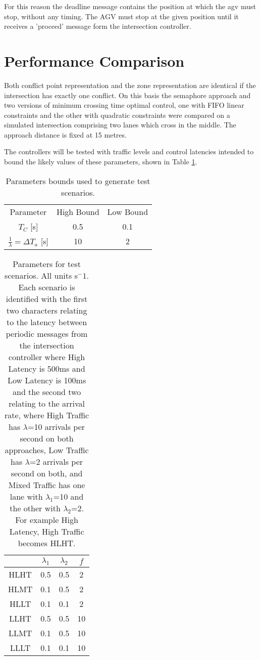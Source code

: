  For this reason the deadline message contains the position at which the agv must stop, without any timing. The AGV must stop at the given position until it receives a 'proceed' message form the intersection controller.
 
 \section{Performance Comparison}
 Both conflict point representation and the zone representation are identical if the intersection has exactly one conflict. On this basis the semaphore approach and two versions of minimum crossing time optimal control, one with FIFO linear constraints and the other with quadratic constraints were compared on a simulated intersection comprising two lanes which cross in the middle. The approach distance is fixed at 15 metres.
 
The controllers will be tested with traffic levels and control latencies intended to bound the likely values of these parameters, shown in Table \ref{tab:test_params}.

 \begin{table}
	\caption{Parameters bounds used to generate test scenarios.}
	\label{tab:test_params} 
	\centering
	\begin{tabular}{ |c|c|c| }
		\hline
		Parameter & High Bound & Low Bound \\
		$T_C$ [s]& 0.5 & 0.1 \\ 
		$\frac{1}{\lambda}=\Delta T_a$ [s]& 10 & 2 \\ 	
		\hline
	\end{tabular}
\end{table}

\begin{table}
	\begin{tabular}{|c|c|c|c|}
		\hline
		& $\lambda_1$ & $\lambda_2$ & $f$ \\
		\hline
		HLHT & 0.5 & 0.5 & 2 \\
		HLMT & 0.1 & 0.5 & 2 \\
		HLLT & 0.1 & 0.1 & 2 \\
		LLHT & 0.5 & 0.5 & 10 \\
		LLMT & 0.1 & 0.5 & 10 \\
		LLLT & 0.1 & 0.1 & 10 \\
		\hline
	\end{tabular}
	\label{tab:params}
	\caption{Parameters for test scenarios. All units s$^-1$. Each scenario is identified with the first two characters relating to the latency between periodic messages from the intersection controller where High Latency is 500ms and  Low Latency is 100ms and the second two relating to the arrival rate, where High Traffic has $\lambda$=10 arrivals per second on both approaches, Low Traffic has $\lambda$=2 arrivals per second on both, and Mixed Traffic has one lane with $\lambda_1$=10 and the other with $\lambda_2$=2. For example High Latency, High Traffic becomes HLHT.}
\end{table}

